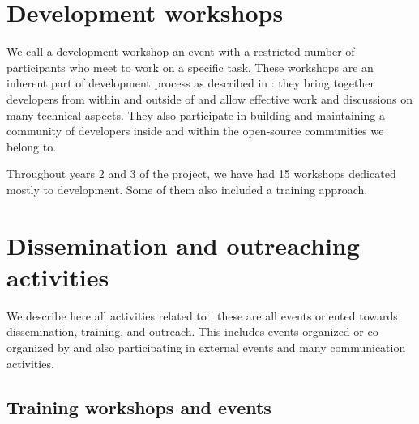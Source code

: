 \documentclass{deliverablereport}
\author{Viviane Pons et al.}
\begin{document}
\maketitle
\githubissuedescription
\newpage
\tableofcontents
\newpage

\section{Development workshops}

We call a development workshop an event with a restricted number of participants
who meet to work on a specific task. These workshops are an inherent part
of \ODK development process as described in :
 they bring together
developers from within and outside of \ODK and allow effective work
and discussions on many technical aspects. They also participate in building
and maintaining a community of developers inside \ODK and within the
open-source communities we belong to.

Throughout years 2 and 3 of the project, we have had 15 workshops dedicated mostly
to development. Some of them also included a training approach. 





\section{Dissemination and outreaching activities}


We describe here all activities related to :
these are all events oriented towards dissemination, training, and outreach. This
includes events organized or co-organized by \ODK and also
participating in external events and many communication activities.

\subsection{Training workshops and events}








\end{document}
